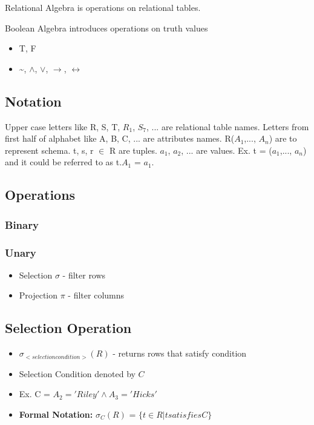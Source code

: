 \documentclass[twoside]{article}
\begin{document}
Relational Algebra is operations on relational tables.

Boolean Algebra introduces operations on truth values
\begin{itemize}
    \item T, F
    \item \textasciitilde, $\wedge$, $\vee$, $\rightarrow$, $\leftrightarrow$
\end{itemize}

\subsection*{Notation}
Upper case letters like R, S, T, $R_1$, $S_7$, ... are relational table names.
Letters from first half of alphabet like A, B, C, ... are attributes names.
R($A_1$,..., $A_n$) are to represent schema. t, s, r $\in$ R are tuples. $a_1$, $a_2$, ...
are values. Ex. t = ($a_1$,..., $a_n$) and it could be referred to as t.$A_1$ = $a_1$.

\subsection*{Operations}
\subsubsection*{Binary}
\subsubsection*{Unary}
\begin{itemize}
    \item Selection $\sigma$ - filter rows
    \item Projection $\pi$ - filter columns
\end{itemize}

\subsection*{Selection Operation}
\begin{itemize}
    \item $\sigma_{<selection condition>}(R)$ - returns rows that satisfy condition
    \item Selection Condition denoted by $C$
    \item Ex. C = $A_2 = 'Riley' \wedge A_3 = 'Hicks'$
    \item \textbf{Formal Notation:} $\sigma_C(R)$ = $\{t \in R | t  satisfies C\}$
\end{itemize}
\end{document}
